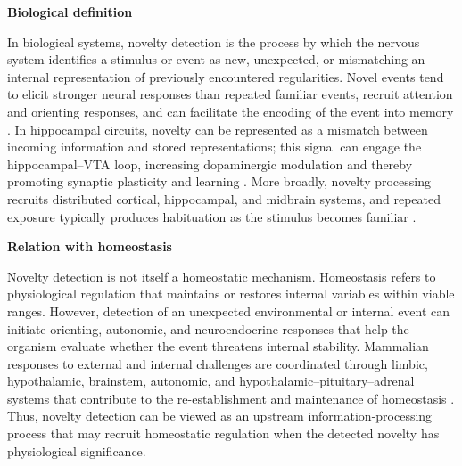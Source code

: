 \documentclass{book}
\providecommand{\ProjectDeepHeading}[2]{%
    \par\medskip\noindent\textbf{#2}\par\smallskip
}
\begin{document}
\ProjectDeepHeading{8}{Biological definition}
   In biological systems, novelty detection is the process by which the nervous system identifies a stimulus or event as new, unexpected, or mismatching an internal representation of previously encountered regularities. Novel events tend to elicit stronger neural responses than repeated familiar events, recruit attention and orienting responses, and can facilitate the encoding of the event into memory \cite{ranganath-rainer-2003-neural-mechanisms-for-detecting-and-remembering-novel-events,sokolov-1990-the-orienting-response-and-future-directions-of-its-development}. In hippocampal circuits, novelty can be represented as a mismatch between incoming information and stored representations; this signal can engage the hippocampal--VTA loop, increasing dopaminergic modulation and thereby promoting synaptic plasticity and learning \cite{lisman-grace-2005-the-hippocampal-vta-loop-controlling-the-entry-of-information-into-long-term-memory}. More broadly, novelty processing recruits distributed cortical, hippocampal, and midbrain systems, and repeated exposure typically produces habituation as the stimulus becomes familiar \cite{tapper-molas-2020-midbrain-circuits-of-novelty-processing}.

   \ProjectDeepHeading{8}{Relation with homeostasis}
   Novelty detection is not itself a homeostatic mechanism. Homeostasis refers to physiological regulation that maintains or restores internal variables within viable ranges. However, detection of an unexpected environmental or internal event can initiate orienting, autonomic, and neuroendocrine responses that help the organism evaluate whether the event threatens internal stability. Mammalian responses to external and internal challenges are coordinated through limbic, hypothalamic, brainstem, autonomic, and hypothalamic--pituitary--adrenal systems that contribute to the re-establishment and maintenance of homeostasis \cite{ulrich-lai-herman-2009-neural-regulation-of-endocrine-and-autonomic-stress-responses}. Thus, novelty detection can be viewed as an upstream information-processing process that may recruit homeostatic regulation when the detected novelty has physiological significance.
\end{document}
